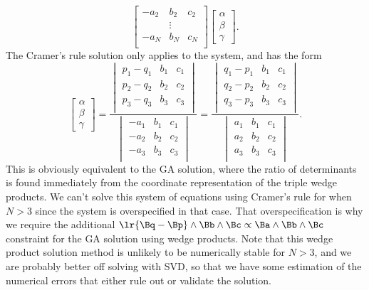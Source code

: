 {\begin{equation}
\begin{bmatrix}
-a_2 & b_2 & c_2 \\
     & \vdots & \\
-a_N & b_N & c_N \\
\end{bmatrix}
\begin{bmatrix}
\alpha \\
\beta \\
\gamma
\end{bmatrix}.
\end{equation}
The Cramer's rule solution only applies to the  system, and has the form
\begin{equation}\label{eqn:solutionOfLinearSystem:1460}
\begin{bmatrix}
\alpha \\
\beta \\
\gamma
\end{bmatrix}
=
\frac{
\begin{vmatrix}
p_1 - q_1 & b_1 & c_1 \\
p_2 - q_2 & b_2 & c_2 \\
p_3 - q_3 & b_3 & c_3 \\
\end{vmatrix}
}
{
\begin{vmatrix}
-a_1 & b_1 & c_1 \\
-a_2 & b_2 & c_2 \\
-a_3 & b_3 & c_3 \\
\end{vmatrix}
}
=
\frac{
\begin{vmatrix}
q_1 - p_1 & b_1 & c_1 \\
q_2 - p_2 & b_2 & c_2 \\
q_3 - p_3 & b_3 & c_3 \\
\end{vmatrix}
}
{
\begin{vmatrix}
a_1 & b_1 & c_1 \\
a_2 & b_2 & c_2 \\
a_3 & b_3 & c_3 \\
\end{vmatrix}
}.
\end{equation}
This is obviously equivalent to the GA solution, where the ratio of determinants is found immediately from the coordinate representation of the triple wedge products.  We can't solve this system of equations using Cramer's rule for  when \( N > 3 \) since the system is overspecified in that case.  That overspecification is why we require the additional
\( \lr{ \Bq - \Bp } \wedge \Bb \wedge \Bc \propto \Ba \wedge \Bb \wedge \Bc \)
constraint for the GA solution using wedge products.  Note that this wedge product solution method is unlikely to be numerically stable for \( N > 3 \), and we are probably better off solving with SVD, so that we have some estimation of the numerical errors that either rule out or validate the solution.
} %
